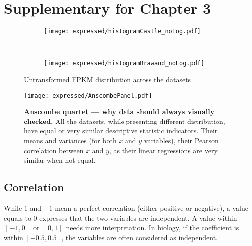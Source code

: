 \chapter{Supplementary for Chapter 3}
\label{ch:SupplExpress}

\begin{figure}[htbp]
    \centering
    \begin{subfigure}[b]{0.45\textwidth} %
        \centering \texttt{[image: expressed/histogramCastle\_noLog.pdf]}
        \caption{}\label{fig:histCastle_nolog}
    \end{subfigure}
~ %
    \begin{subfigure}[b]{0.45\textwidth} %
          \centering \texttt{[image: expressed/histogramBrawand\_noLog.pdf]}
          \caption{}\label{fig:histBrawand_nolog}
      \end{subfigure}
\caption{Untransformed FPKM distribution across the
    datasets}\label{fig:unscaledDistrib}
\end{figure}

\begin{figure}
    \texttt{[image: expressed/AnscombePanel.pdf]}\centering
    \caption[Anscombe quartet --- why data should always visualy checked]
    {\label{fig:Anscombe}\textbf{Anscombe quartet --- why data should always
    visually checked.}\smallbreak{} All the datasets, while presenting
    different distribution, have equal or very similar descriptive statistic
    indicators. Their means and variances (for both $x$ and $y$ variables),
    their Pearson correlation between $x$ and $y$,
    as their linear regressions are very similar when not equal.}
\end{figure}


\section{Correlation}\label{sec:CorrMore}

While $1$ and $-1$ mean a perfect correlation (either positive or negative),
a value equals to $0$ expresses that the two variables are independent.
A value within $\mathopen]-1,0\mathclose[$
or $\mathopen]0,1\mathclose[$ needs more interpretation. In biology, if the
coefficient is within $[-0.5,0.5]$, the variables are often considered as
independent.


